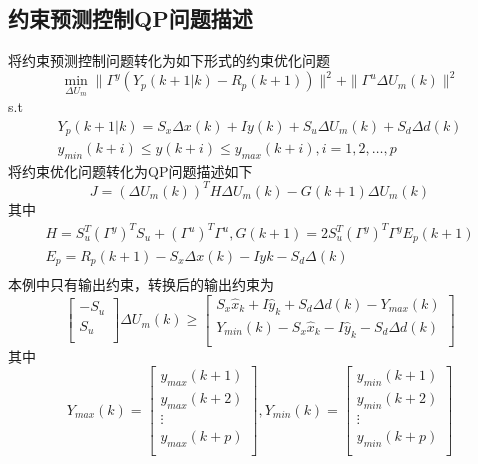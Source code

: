 \documentclass[UTF8]{article}
\begin{document}
\subsection{约束预测控制QP问题描述}
将约束预测控制问题转化为如下形式的约束优化问题
\[
    \min\limits_{\Delta U_{m}}\| \Gamma^{y}(Y_{p}(k+1|k)-R_{p}(k+1)) \|^{2}+\| \Gamma^{u}\Delta U_{m}(k)\|^{2}
\]
s.t 
\[
    \begin{array}{c}
        Y_{p}(k+1|k)=S_{x}\Delta x(k)+ Iy(k)+{S}_{u} \Delta U_{m}(k)+ {S}_{d} \Delta d(k) \\ 
        y_{min}(k+i)\leq y(k+i)\leq y_{max}(k+i),i=1,2,\ldots,p
    \end{array}
\]
将约束优化问题转化为QP问题描述如下
\[
    J = (\Delta U_{m}(k))^{T}H\Delta U_{m}(k)-G(k+1)\Delta U_{m}(k)
\]
其中
\[
    \begin{array}{l}
    H = {S}_{u}^{T}(\Gamma^{y})^{T} {S}_{u}+(\Gamma^{u})^{T}\Gamma^{u},G(k+1)=2{S}_{u}^{T}(\Gamma^{y})^{T}\Gamma^{y}E_{p}(k+1)\\
    E_{p}=R_{p}(k+1)-{S}_{x}\Delta x(k)-Iy{k}-{S}_{d} \Delta(k)\\
    \end{array}
\]
本例中只有输出约束，转换后的输出约束为
\[
    \left[
    \begin{array}{c}
        -{S}_{u}\\
        {S}_{u}\\
    \end{array}
    \right]
    \Delta U_{m}(k) \geq 
    \left[
    \begin{array}{c}
        S_{x}\hat{x}_{k}+I\hat{y}_{k}+S_{d}\Delta d(k)-Y_{max}(k)\\
        Y_{min}(k)-S_{x}\hat{x}_{k}-I\hat{y}_{k}-S_{d}\Delta d(k)\\
    \end{array}
    \right]
\]
其中
\[
    Y_{max}(k)=
    \left[
        \begin{array}{c}
            y_{max}(k+1)\\
            y_{max}(k+2)\\
            \vdots\\
            y_{max}(k+p)\\
        \end{array}
    \right]
    ,
    Y_{min}(k)=
    \left[
        \begin{array}{c}
            y_{min}(k+1)\\
            y_{min}(k+2)\\
            \vdots\\
            y_{min}(k+p)\\
        \end{array}
    \right]
\]
\end{document}
